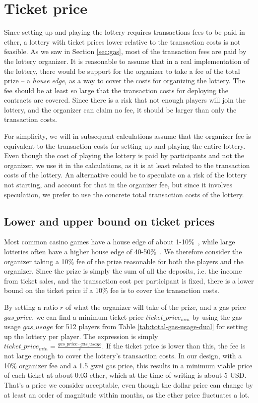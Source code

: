 \section{Ticket price}
\label{sec:ticket-price}

Since setting up and playing the lottery requires transactions fees to be paid in ether, a lottery with ticket prices lower relative to the transaction costs is not feasible. As we saw in Section \ref{sec:gas}, most of the transaction fees are paid by the lottery organizer. It is reasonable to assume that in a real implementation of the lottery, there would be support for the organizer to take a fee of the total prize – a \emph{house edge}, as a way to cover the costs for organizing the lottery. The fee should be at least so large that the transaction costs for deploying the contracts are covered. Since there is a risk that not enough players will join the lottery, and the organizer can claim no fee, it should be larger than only the transaction costs. 

For simplicity, we will in subsequent calculations assume that the organizer fee is equivalent to the transaction costs for setting up and playing the entire lottery. Even though the cost of playing the lottery is paid by participants and not the organizer, we use it in the calculations, as it is at least related to the transaction costs of the lottery. An alternative could be to speculate on a risk of the lottery not starting, and account for that in the organizer fee, but since it involves speculation, we prefer to use the concrete total transaction costs of the lottery.

\subsection{Lower and upper bound on ticket prices}
Most common casino games have a house edge of about 1-10\%~\cite{walsh_houses_nodate}, while large lotteries often have a higher house edge of 40-50\%~\cite{shackleford_house_nodate}. We therefore consider the organizer taking a 10\% fee of the prize reasonable for both the players and the organizer. Since the prize is simply the sum of all the deposits, i.e. the income from ticket sales, and the transaction cost per participant is fixed, there is a lower bound on the ticket price if a 10\% fee is to cover the transaction costs.

By setting a ratio $r$ of what the organizer will take of the prize, and a gas price $gas\_price$, we can find a minimum ticket price $ticket\_price_{min}$ by using the gas usage $gas\_usage$ for 512 players from Table \ref{tab:total-gas-usage-dual} for setting up the lottery per player. The expression is simply $ticket\_price_{min}=\frac{gas\_price \cdot gas\_usage}{r}$. If the ticket price is lower than this, the fee is not large enough to cover the lottery's transaction costs.
In our design, with a 10\% organizer fee and a 1.5 gwei gas price, this results in a minimum viable price of each ticket at about 0.03 ether, which at the time of writing is about 5 USD. That's a price we consider acceptable, even though the dollar price can change by at least an order of magnitude within months, as the ether price fluctuates a lot.

